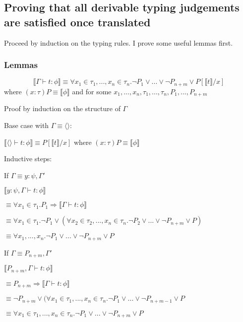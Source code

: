 \documentclass[12pt,a4paper,titlepage]{article}
\newcommand{\bbrackets}[1]{\llbracket #1 \rrbracket}
\begin{document}
    \subsection{Proving that all derivable typing judgements are satisfied once translated}
    Proceed by induction on the typing rules.
    I prove some useful lemmas first.

    \subsubsection{Lemmas}

    \begin{equation}
        \bbrackets{\Gamma \vdash t: \phi} \equiv \forall x_1 \in \tau_1, ..., x_n \in \tau_n . \neg P_1 \lor ... \lor \neg P_{n+m} \lor P[\bbrackets{t} / x]
    \end{equation}
    where $(x: \tau)P \equiv \bbrackets{\phi}$
    and for some $x_1, ..., x_n, \tau_1, ..., \tau_n, P_1, ..., P_{n+m}$

    Proof by induction on the structure of $\Gamma$

    Base case with $\Gamma \equiv \langle \rangle$:

    $\bbrackets{\langle \rangle \vdash t: \phi} \equiv P[\bbrackets{t}/x]$ where $(x: \tau)P \equiv \bbrackets{\phi}$

    Inductive steps:

    If $\Gamma \equiv y: \psi, \Gamma'$

    $\bbrackets{y: \psi, \Gamma \vdash t: \phi}$

    $\equiv \forall x_1 \in \tau_1 . P_1 \Rightarrow \bbrackets{\Gamma \vdash t: \phi}$

    $\equiv \forall x_1 \in \tau_1 . \neg P_1 \lor (\forall x_2 \in \tau_2, ..., x_n \in \tau_n . \neg P_2 \lor ... \lor \neg P_{n+m} \lor P)$

    $\equiv \forall x_1, ..., x_n . \neg P_1 \lor ... \lor \neg P_{n+m} \lor P$

    If $\Gamma \equiv P_{n+m}, \Gamma'$

    $\bbrackets{P_{n+m}, \Gamma \vdash t: \phi}$

    $\equiv P_{n+m} \Rightarrow \bbrackets{\Gamma \vdash t: \phi}$

    $\equiv \neg P_{n+m} \lor (\forall x_1 \in \tau_1, ..., x_n \in \tau_n . \neg P_1 \lor ... \lor \neg P_{n+m-1} \lor P$

    $\equiv \forall x_1 \in \tau_1, ..., x_n \in \tau_n . \neg P_1 \lor ... \lor \neg P_{n+m} \lor P$
\end{document}
